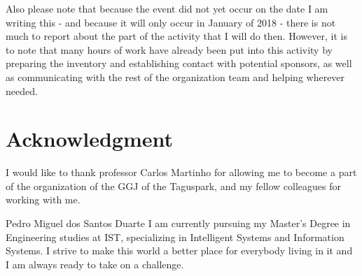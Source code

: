 \documentclass[a4paper,12pt,journal,twoside,compsoc]{PPIEEEtran}
\begin{document}
Also please note that because the event did not yet occur on the date I am writing this - and because it will only occur in January of 2018 - there is not much to report about the part of the activity that I will do then. However, it is to note that many hours of work have already been put into this activity by preparing the inventory and establishing contact with potential sponsors, as well as communicating with the rest of the organization team and helping wherever needed.

\ifCLASSOPTIONcompsoc
  \section*{} %
\else
  \section*{Acknowledgment}
\fi

I would like to thank professor Carlos Martinho for allowing me to become a part of the organization of the \ac{GGJ} of the Taguspark, and my fellow colleagues for working with me.

% 

\begin{IEEEbiography}{Pedro Miguel dos Santos Duarte}
I am currently pursuing my Master's Degree in Engineering studies at \ac{IST}, specializing in Intelligent Systems and Information Systems. I strive to make this world a better place for everybody living in it and I am always ready to take on a challenge.
\end{IEEEbiography}


	
\end{document}
